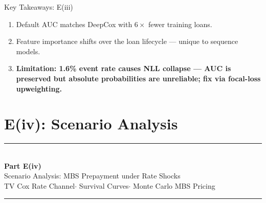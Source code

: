 \documentclass[10pt,aspectratio=169]{beamer}
\begin{document}
\begin{frame}{Key Takeaways: E(iii)}
    \begin{enumerate}\itemsep14pt
        \item Default AUC matches DeepCox with $6\times$ fewer training loans.
        \item Feature importance shifts over the loan lifecycle --- unique to sequence models.
        \item \textbf{Limitation: 1.6\% event rate causes NLL collapse --- AUC is preserved but absolute probabilities are unreliable; fix via focal-loss upweighting.}
    \end{enumerate}
\end{frame}

\section{E(iv): Scenario Analysis}

\begin{frame}
    \vfill
    \begin{center}
        {\color{accent}\rule{0.28\linewidth}{1.2pt}}\\[0.7em]
        {\Large\bfseries Part E(iv)}\\[0.5em]
        {\large Scenario Analysis: MBS Prepayment under Rate Shocks}\\[0.4em]
        {\small TV Cox Rate Channel\enspace$\cdot$\enspace
                Survival Curves\enspace$\cdot$\enspace
                Monte Carlo MBS Pricing}\\[0.7em]
        {\color{accent}\rule{0.28\linewidth}{1.2pt}}
    \end{center}
    \vfill
\end{frame}
\end{document}
